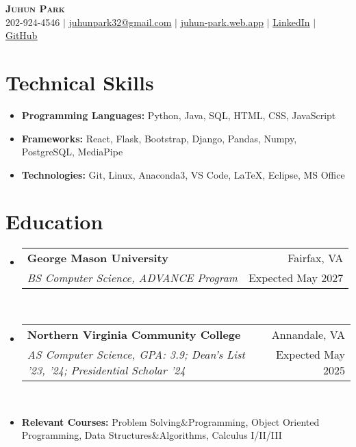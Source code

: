 \documentclass[letterpaper,11pt]{article}
\makeatletter
\newcommand{\resumeItem}[1]{
  \item\small{
    {#1 \vspace{-3pt}}
  }
}
\newcommand{\resumeItemThin}[1]{
  \item\small{
    {#1 \vspace{-7pt}}
  }
}
\newcommand{\resumeSubheading}[4]{
    \item
    \begin{tabular*}{0.97\textwidth}[t]{l@{\extracolsep{\fill}}r@{\hspace{-0.2in}}}
        \small{\textbf{#1}} & \small{#2} \\
        \textit{\small#3} & \small #4 \\
    \end{tabular*}\vspace{-7pt}
}
\newcommand{\resumeSubHeadingListStart}{\begin{itemize}[leftmargin=0.00in, rightmargin=-0.2in, label={}]}
\newcommand{\resumeSubHeadingListEnd}{\end{itemize}\vspace{-7pt}}
\newcommand{\resumeItemListStart}{\begin{itemize}[leftmargin=0.15in, rightmargin=0.15in]}
\newcommand{\resumeItemListEnd}{\end{itemize}\vspace{-7pt}}
\makeatother
\begin{document}

\begin{center}
  \textbf{\Huge \scshape {Juhun Park}} \\ \vspace{1pt}
  \small 202-924-4546 $|$
  \href{mailto:riann3207@gmail.com}{\underline{juhunpark32@gmail.com}} $|$
  \href{https://juhun-park.web.app/}{\underline{juhun-park.web.app}} $|$
  \href{https://linkedin.com/in/juhun-park}{\underline{LinkedIn}} $|$
  \href{https://github.com/juhun32}{\underline{GitHub}} \\
\end{center}

\vspace{-7pt}


\section{Technical Skills}
\vspace{3pt}
\resumeItemListStart
\resumeItemThin{\textbf{Programming Languages: } {Python, Java, SQL, HTML, CSS, JavaScript}}\\
\resumeItemThin{\textbf{Frameworks: }{React, Flask, Bootstrap, Django, Pandas, Numpy, PostgreSQL, MediaPipe}}\\
\resumeItemThin{\textbf{Technologies: } {Git, Linux, Anaconda3, VS Code, LaTeX, Eclipse, MS Office}}\\
\resumeItemListEnd
\vspace{3pt}


\section{Education}
\resumeSubHeadingListStart
\resumeSubheading
{George Mason University}{Fairfax, VA}
{BS Computer Science, ADVANCE Program}{Expected May 2027}\\

\resumeSubheading
{Northern Virginia Community College}{Annandale, VA}
{AS Computer Science, GPA: 3.9; Dean's List '23, '24; Presidential Scholar '24}{Expected May 2025} \\

\resumeItem{\textbf{Relevant Courses: }{Problem Solving\&Programming, Object Oriented Programming, Data Structures\&Algorithms, Calculus I/II/III}}
\resumeSubHeadingListEnd
\end{document}

